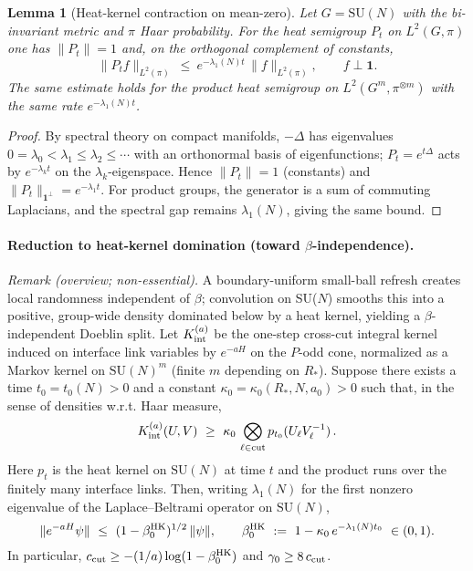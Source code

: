\documentclass[11pt]{amsart}
\theoremstyle{plain}
\newtheorem{lemma}[theorem]{Lemma}
\theoremstyle{definition}
\theoremstyle{remark}
\begin{document}
\begin{lemma}[Heat-kernel contraction on mean-zero]\label{lem:hk-contraction}
Let $G=\mathrm{SU}(N)$ with the bi-invariant metric and $\pi$ Haar probability. For the heat semigroup $P_t$ on $L^2(G,\pi)$ one has $\|P_t\|=1$ and, on the orthogonal complement of constants,
\[
  \|P_t f\|_{L^2(\pi)}\ \le\ e^{-\lambda_1(N) t}\,\|f\|_{L^2(\pi)},\qquad f\perp \mathbf 1.
\]
The same estimate holds for the product heat semigroup on $L^2(G^m,\pi^{\otimes m})$ with the same rate $e^{-\lambda_1(N) t}$.
\end{lemma}

\begin{proof}
By spectral theory on compact manifolds, $-\Delta$ has eigenvalues $0=\lambda_0<\lambda_1\le\lambda_2\le\cdots$ with an orthonormal basis of eigenfunctions; $P_t=e^{t\Delta}$ acts by $e^{-\lambda_k t}$ on the $\lambda_k$-eigenspace. Hence $\|P_t\|=1$ (constants) and $\|P_t\|_{\mathbf 1^\perp}=e^{-\lambda_1 t}$. For product groups, the generator is a sum of commuting Laplacians, and the spectral gap remains $\lambda_1(N)$, giving the same bound.
\end{proof}

\paragraph{Reduction to heat-kernel domination (toward $\beta$-independence).} \emph{Remark (overview; non-essential).} A boundary-uniform small-ball refresh creates local randomness independent of $\beta$; convolution on SU($N$) smooths this into a positive, group-wide density dominated below by a heat kernel, yielding a $\beta$-independent Doeblin split.
Let $K_{\rm int}^{(a)}$ be the one-step cross-cut integral kernel induced on interface link variables by $e^{-aH}$ on the $P$-odd cone, normalized as a Markov kernel on $\mathrm{SU}(N)^m$ (finite $m$ depending on $R_*$). Suppose there exists a time $t_0=t_0(N)>0$ and a constant $\kappa_0=\kappa_0(R_*,N,a_0)>0$ such that, in the sense of densities w.r.t. Haar measure,
\[
  K_{\rm int}^{(a)}(U,V)\ \ge\ \kappa_0\,\bigotimes_{\ell\in \text{cut}} p_{t_0}(U_\ell V_\ell^{-1})\,.
\]
Here $p_{t}$ is the heat kernel on $\mathrm{SU}(N)$ at time $t$ and the product runs over the finitely many interface links. Then, writing $\lambda_1(N)$ for the first nonzero eigenvalue of the Laplace--Beltrami operator on $\mathrm{SU}(N)$,
\[
  \|e^{-aH}\psi\|\ \le\ (1-\beta_0^{\rm HK})^{1/2}\,\|\psi\|,\qquad
  \beta_0^{\rm HK}\ :=\ 1-\kappa_0\,e^{-\lambda_1(N) t_0}\ \in (0,1).
\]
In particular, $c_{\rm cut}\ge -(1/a)\log(1-\beta_0^{\rm HK})$ and $\gamma_0\ge 8\,c_{\rm cut}$.
\end{document}
